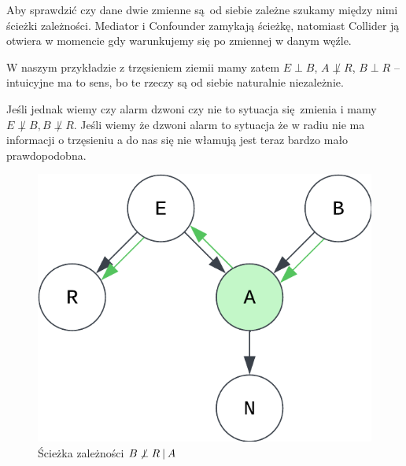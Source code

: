 Aby sprawdzić czy dane dwie zmienne są od siebie zależne szukamy między nimi ścieżki zależności. Mediator i Confounder zamykają ścieżkę, natomiast Collider ją otwiera w momencie gdy warunkujemy się po zmiennej w danym węźle.

W naszym przykładzie z trzęsieniem ziemii mamy zatem \( E \perp B \), \( A \not \perp R \), \( B \perp R \) -- intuicyjne ma to sens, bo te rzeczy są od siebie naturalnie niezależnie.

Jeśli jednak wiemy czy alarm dzwoni czy nie to sytuacja się zmienia i mamy \( E \not \perp B, B \not \perp R \).  Jeśli wiemy że dzwoni alarm to sytuacja że w radiu nie ma informacji o trzęsieniu a do nas się nie włamują jest teraz bardzo mało prawdopodobna.

\begin{figure}[H]
    \centering
    \includegraphics{chapters/graphical models/img/example-path.png}
    \caption{Ścieżka zależności \( B \not \perp R \:\vert\: A \)}
\end{figure}
